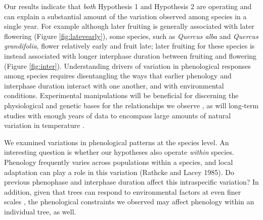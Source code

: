 \documentclass{article}
\begin{document}
\par Our results indicate that \textit{both} Hypothesis 1 and Hypothesis 2 are operating and can explain a substantial amount of the variation observed among species in a single year. For example although later fruiting is generally associated with later flowering (Figure \ref{fig:latevearly}), some species, such as \textit{Quercus alba} and \textit{Quercus grandifolia}, flower relatively early and fruit late; later fruiting for these species is instead associated with longer interphase duration between fruiting and flowering (Figure \ref{fig:inter}).  Understanding drivers of variation in phenological responses among species requires disentangling the ways that earlier phenology and interphase duration interact with one another, and with environmental conditions. Experimental manipulations will be beneficial for discerning the physiological and genetic bases for the relationships we observe \citep{flint1974}, as will long-term studies with enough years of data to encompass large amounts of natural variation in temperature \citep[e.g.,][]{inouye2008}.
\par We examined variations in phenological patterns at the species level. An interesting question is whether our hypotheses also operate \emph{within} species. Phenology frequently varies across populations within a species, and local adaptation can play a role in this variation (Rathcke and Lacey 1985).  Do previous phenophase and interphase duration affect this intraspecific variation? In addition, given that trees can respond  to environmental factors at even finer scales \citep[e.g., the branch level,][]{nakamura2010}, the phenological constraints we observed may affect phenology within an individual tree, as well. 
\end{document}
